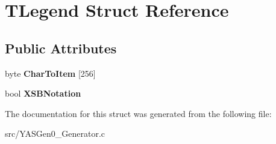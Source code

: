 \hypertarget{struct_t_legend}{}\section{T\+Legend Struct Reference}
\label{struct_t_legend}
\subsection*{Public Attributes}
\begin{DoxyCompactItemize}
\item 
\mbox{\label{struct_t_legend_a4c8e462a764e1a5659fca33c98291fbd}} 
byte {\bfseries Char\+To\+Item} \mbox{[}256\mbox{]}
\item 
\mbox{\label{struct_t_legend_ab8a64aa2538e2b561ea1533cd376b1e1}} 
bool {\bfseries X\+S\+B\+Notation}
\end{DoxyCompactItemize}


The documentation for this struct was generated from the following file\+:\begin{DoxyCompactItemize}
\item 
src/Y\+A\+S\+Gen0\+\_\+\+Generator.\+c\end{DoxyCompactItemize}
